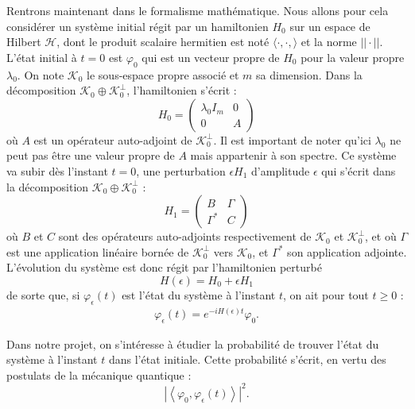 \documentclass[12pt,openany,a4paper, titlepage]{article}
\newcommand{\la}{\left\langle}
\newcommand{\ra}{\right\rangle}
\newcommand{\vp}{\varphi}
\theoremstyle{definition}
\theoremstyle{definition}
\theoremstyle{definition}
\theoremstyle{definition}
\theoremstyle{definition}
\theoremstyle{definition}
\begin{document}
Rentrons maintenant dans le formalisme mathématique. Nous allons pour cela considérer un système initial régit par un hamiltonien $H_0$ sur un espace de Hilbert $\mathcal{H}$, dont le produit scalaire hermitien est noté $\langle \cdot, \cdot, \rangle$ et la norme $||\cdot ||$. L'état initial à $t=0$ est $\vp_0$ qui est un vecteur propre de $H_0$ pour la valeur propre $\lambda_0$. On note $\mathcal{K}_0$ le sous-espace propre associé et $m$ sa dimension. Dans la décomposition $\mathcal{K}_0 \oplus \mathcal{K}_0^\perp$, l'hamiltonien s'écrit :
\begin{equation}
    H_0 = \begin{pmatrix}
\lambda_0I_m & 0 \\
0    & A 
\end{pmatrix}
\end{equation}
où $A$ est un opérateur auto-adjoint de $\mathcal{K}_0^\perp$. Il est important de noter qu'ici $\lambda_0$ ne peut pas être une valeur propre de $A$ mais appartenir à son spectre. Ce système va subir dès l'instant $t=0$, une perturbation $\epsilon H_1$ d'amplitude $\epsilon$ qui s'écrit dans la décomposition $\mathcal{K}_0 \oplus \mathcal{K}_0^\perp$ :
\begin{equation}
    H_1 = \begin{pmatrix}
B        & \Gamma \\
\Gamma^* &  C
\end{pmatrix}
\end{equation}
où $B$ et $C$ sont des opérateurs auto-adjoints respectivement de $\mathcal{K}_0$ et $\mathcal{K}_0^\perp$, et où $\Gamma$ est une application linéaire bornée de $\mathcal{K}_0^\perp$ vers $\mathcal{K}_0$, et $\Gamma^*$ son application adjointe. L'évolution du système est donc régit par l'hamiltonien perturbé
\begin{equation}
    H(\epsilon) = H_0 + \epsilon H_1
\end{equation}
de sorte que, si $\vp_\epsilon(t)$ est l'état du système à l'instant $t$, on ait pour tout $t\geq 0$ :
\begin{eqnarray}
    \vp_\epsilon(t) = e^{-iH(\epsilon)t}\vp_0.
\end{eqnarray}

Dans notre projet, on s'intéresse à étudier la probabilité de trouver l'état du système à l'instant $t$ dans l'état initiale. Cette probabilité s'écrit, en vertu des postulats de la mécanique quantique :
\begin{equation}
    |\la \vp_0, \vp_\epsilon(t) \ra |^2.
\end{equation}
\end{document}
